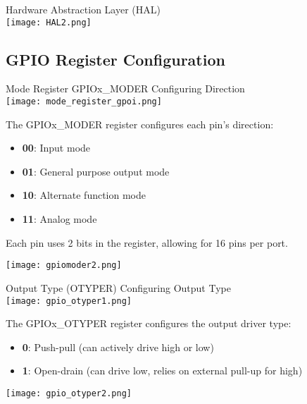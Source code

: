 \begin{concept}{Hardware Abstraction Layer (HAL)}\\
    \texttt{[image: HAL2.png]}
\end{concept}

\raggedcolumns
\columnbreak

\subsection{GPIO Register Configuration}


\begin{concept}{Mode Register GPIOx\_MODER} Configuring Direction\\
    \texttt{[image: mode\_register\_gpoi.png]}

    \begin{minipage}{0.65\linewidth}
        The GPIOx\_MODER register configures each pin's direction:
        \begin{itemize}
            \item \textbf{00}: Input mode
            \item \textbf{01}: General purpose output mode
            \item \textbf{10}: Alternate function mode
            \item \textbf{11}: Analog mode
        \end{itemize}
        Each pin uses 2 bits in the register, allowing for 16 pins per port.
    \end{minipage}
    \begin{minipage}{0.35\linewidth}
        \texttt{[image: gpiomoder2.png]}
    \end{minipage}
\end{concept}

\begin{concept}{Output Type (OTYPER)} Configuring Output Type\\
    \texttt{[image: gpio\_otyper1.png]}

    \begin{minipage}{0.6\linewidth}
    The GPIOx\_OTYPER register configures the output driver type:
    \begin{itemize}
        \item \textbf{0}: Push-pull (can actively drive high or low)
        \item \textbf{1}: Open-drain (can drive low, relies on external pull-up for high)
    \end{itemize}
    \end{minipage}
    \begin{minipage}{0.4\linewidth}
        \texttt{[image: gpio\_otyper2.png]}
    \end{minipage}
\end{concept}

